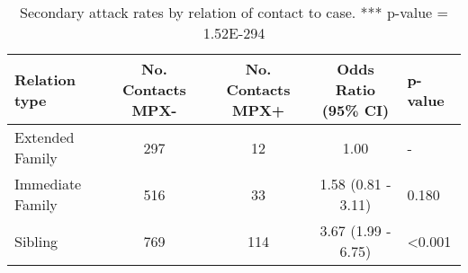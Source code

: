       
\begin{table}[!hb]
    \caption{Secondary attack rates by relation of contact to case. *** p-value = 1.52E-294}
    \begin{tabular}{@{}lccc@{}}
    \toprule
    Relation type & No. Contacts MPX- & No. Contacts MPX+ & Odds Ratio (95\% CI) & p-value \\
    \cmidrule
    
  Extended Family    &   297   &    12 & 1.00  &           -\\
  Immediate Family   &   516    &   33 & 1.58 (0.81 - 3.11) & 0.180\\
  Sibling             &  769  &    114 &  3.67 (1.99 - 6.75) & <0.001\\

    \bottomrule
    \end{tabular}
    \label{table2}
\end{table}

